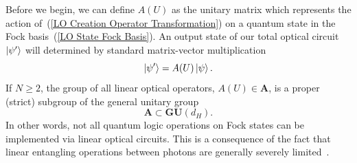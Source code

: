 \documentclass[aps,pra,twocolumn,showpacs,superscriptaddress,floatfix,10pt]{revtex4}
\begin{document}
Before we begin, we can define $A(U)$ as the unitary matrix which represents the action of~(\ref{LO Creation Operator Transformation}) on a quantum state in the Fock basis~(\ref{LO State Fock Basis}). An output state of our total optical circuit $\ket{\psi^\prime}$ will determined by standard matrix-vector multiplication
\begin{equation}
\label{Matrix Vector Product}
\ket{\psi^\prime} = A(U) \ket{\psi}.
\end{equation}
If $N \ge 2$, the group of all linear optical operators, $ A(U) \in \textbf{A}$, is a proper (strict) subgroup of the general unitary group
\begin{equation}
\label{Proper Subgroup}
\textbf{A} \subset \textbf{GU}(d_H).
\end{equation}
In other words, not all quantum logic operations on Fock states can be implemented via linear optical circuits. This is a consequence of the fact that linear entangling operations between photons are generally severely limited~\cite{Hong Ou Mandel}. 
\end{document}
